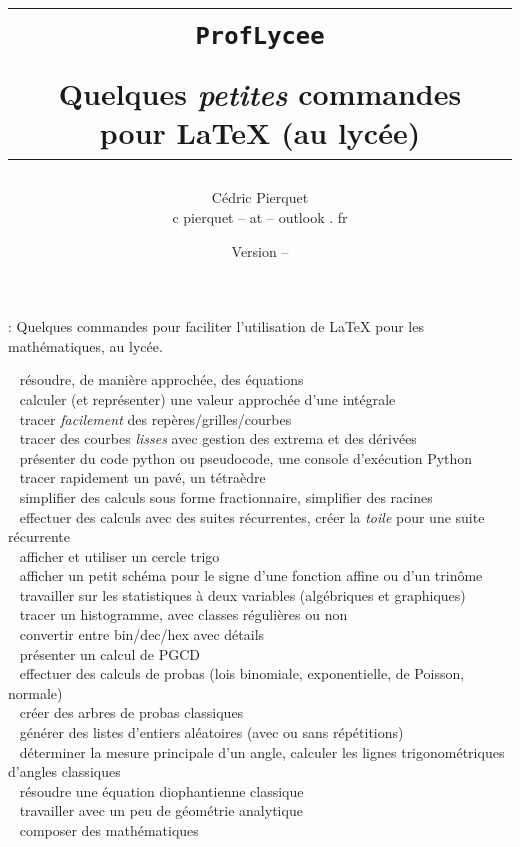 \documentclass[a4paper,french,11pt]{article}
\title{%
\begin{minipage}{0.85\linewidth}
	\begin{tcolorbox}[colframe=yellow,colback=yellow!15]
		\begin{center}
			\begin{tabular}{c}
				\lstinline!ProfLycee!\\
				\\
				Quelques \textit{petites} commandes pour  \LaTeX{} (au lycée)
			\end{tabular}
		\end{center}
	\end{tcolorbox}
\end{minipage}
}
\author{
	\begin{tabular}{c}
		Cédric Pierquet\\
		{\ttfamily c pierquet -- at -- outlook . fr}
	\end{tabular}
}
\date{Version \PLversion{} -- \PLdate}
\newcommand\deblst{{\tiny\faCode}~}
\begin{document}
\setlength{\aweboxleftmargin}{0.07\linewidth}
\setlength{\aweboxcontentwidth}{0.93\linewidth}
\setlength{\aweboxvskip}{8pt}

\pagestyle{fancy}

\maketitle

\thispagestyle{empty}

{ : Quelques commandes pour faciliter l'utilisation de \LaTeX{} pour les mathématiques, au lycée.}

\medskip

{\footnotesize\noindent%
{\deblst} résoudre, de manière approchée, des équations\\
{\deblst} calculer (et représenter) une valeur approchée d'une intégrale\\
{\deblst} tracer \textit{facilement} des repères/grilles/courbes\\
{\deblst} tracer  des courbes \textit{lisses} avec gestion des extrema et des dérivées\\
{\deblst} présenter du code \textsf{python} ou \textsf{pseudocode}, une console d'exécution \textsf{Python} \\
{\deblst} tracer rapidement un pavé, un tétraèdre \\
{\deblst} simplifier des calculs sous forme fractionnaire, simplifier des racines \\
{\deblst} effectuer des calculs avec des suites récurrentes, créer la \textit{toile} pour une suite récurrente \\
{\deblst} afficher et utiliser un cercle trigo \\
{\deblst} afficher un petit schéma pour le signe d'une fonction affine ou d'un trinôme \\
{\deblst} travailler sur les statistiques à deux variables (algébriques et graphiques) \\
{\deblst} tracer un histogramme, avec classes régulières ou non \\
{\deblst} convertir entre bin/dec/hex avec détails \\
{\deblst} présenter un calcul de PGCD \\
{\deblst} effectuer des calculs de probas (lois binomiale, exponentielle, de Poisson, normale) \\
{\deblst} créer des arbres de probas \og classiques \fg \\
{\deblst} générer des listes d'entiers aléatoires (avec ou sans répétitions) \\
{\deblst} déterminer la mesure principale d'un angle, calculer les lignes trigonométriques d'angles \og classiques \fg{} \\
{\deblst} résoudre une équation diophantienne \og classique \fg{} \\
{\deblst} travailler avec un peu de géométrie analytique \\
{\deblst} composer des mathématiques}
\end{document}
